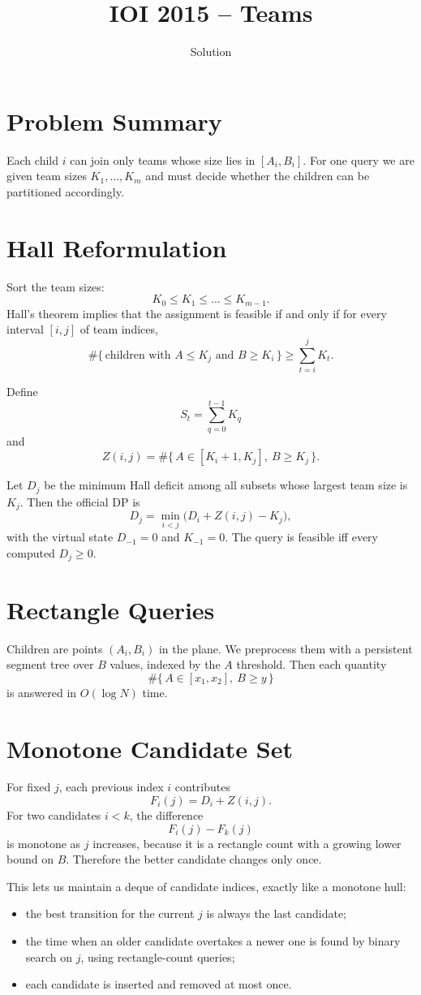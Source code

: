 \documentclass[11pt,a4paper]{article}
\title{IOI 2015 -- Teams}
\author{Solution}
\date{}
\begin{document}
\maketitle

\section{Problem Summary}
Each child $i$ can join only teams whose size lies in $[A_i,B_i]$.
For one query we are given team sizes $K_1,\dots,K_m$ and must decide whether the children
can be partitioned accordingly.

\section{Hall Reformulation}
Sort the team sizes:
\[
K_0 \le K_1 \le \dots \le K_{m-1}.
\]
Hall's theorem implies that the assignment is feasible if and only if for every interval
$[i,j]$ of team indices,
\[
\#\{\,\text{children with } A \le K_j \text{ and } B \ge K_i\,\}
    \ge \sum_{t=i}^{j} K_t.
\]

Define
\[
S_t = \sum_{q=0}^{t-1} K_q
\]
and
\[
Z(i,j)=\#\{\,A \in [K_i+1, K_j],\ B \ge K_j\,\}.
\]

Let $D_j$ be the minimum Hall deficit among all subsets whose largest team size is $K_j$.
Then the official DP is
\[
D_j = \min_{i<j} \bigl(D_i + Z(i,j) - K_j\bigr),
\]
with the virtual state $D_{-1}=0$ and $K_{-1}=0$.
The query is feasible iff every computed $D_j \ge 0$.

\section{Rectangle Queries}
Children are points $(A_i,B_i)$ in the plane.
We preprocess them with a persistent segment tree over $B$ values, indexed by the $A$ threshold.
Then each quantity
\[
\#\{\,A \in [x_1,x_2],\ B \ge y\,\}
\]
is answered in $O(\log N)$ time.

\section{Monotone Candidate Set}
For fixed $j$, each previous index $i$ contributes
\[
F_i(j)=D_i+Z(i,j).
\]
For two candidates $i<k$, the difference
\[
F_i(j)-F_k(j)
\]
is monotone as $j$ increases, because it is a rectangle count with a growing lower bound on $B$.
Therefore the better candidate changes only once.

This lets us maintain a deque of candidate indices, exactly like a monotone hull:
\begin{itemize}
  \item the best transition for the current $j$ is always the last candidate;
  \item the time when an older candidate overtakes a newer one is found by binary search on $j$,
        using rectangle-count queries;
  \item each candidate is inserted and removed at most once.
\end{itemize}
\end{document}
